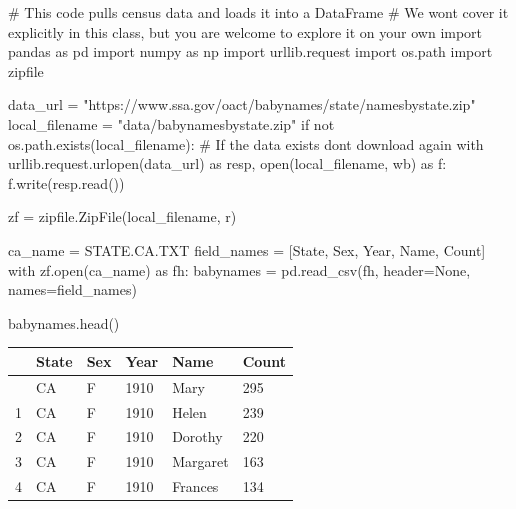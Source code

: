 \documentclass[
  letterpaper,
  DIV=11,
  numbers=noendperiod]{scrreprt}
\newenvironment{Shaded}{\begin{snugshade}}{\end{snugshade}}
\newcommand{\BuiltInTok}[1]{\textcolor[rgb]{0.00,0.23,0.31}{#1}}
\newcommand{\CommentTok}[1]{\textcolor[rgb]{0.37,0.37,0.37}{#1}}
\newcommand{\ControlFlowTok}[1]{\textcolor[rgb]{0.00,0.23,0.31}{#1}}
\newcommand{\ImportTok}[1]{\textcolor[rgb]{0.00,0.46,0.62}{#1}}
\newcommand{\KeywordTok}[1]{\textcolor[rgb]{0.00,0.23,0.31}{#1}}
\newcommand{\NormalTok}[1]{\textcolor[rgb]{0.00,0.23,0.31}{#1}}
\newcommand{\OperatorTok}[1]{\textcolor[rgb]{0.37,0.37,0.37}{#1}}
\newcommand{\StringTok}[1]{\textcolor[rgb]{0.13,0.47,0.30}{#1}}
\newcommand{\VariableTok}[1]{\textcolor[rgb]{0.07,0.07,0.07}{#1}}
\begin{document}
\begin{Shaded}
\begin{Highlighting}[]
\CommentTok{\# This code pulls census data and loads it into a DataFrame}
\CommentTok{\# We won\textquotesingle{}t cover it explicitly in this class, but you are welcome to explore it on your own}
\ImportTok{import}\NormalTok{ pandas }\ImportTok{as}\NormalTok{ pd}
\ImportTok{import}\NormalTok{ numpy }\ImportTok{as}\NormalTok{ np}
\ImportTok{import}\NormalTok{ urllib.request}
\ImportTok{import}\NormalTok{ os.path}
\ImportTok{import}\NormalTok{ zipfile}

\NormalTok{data\_url }\OperatorTok{=} \StringTok{"https://www.ssa.gov/oact/babynames/state/namesbystate.zip"}
\NormalTok{local\_filename }\OperatorTok{=} \StringTok{"data/babynamesbystate.zip"}
\ControlFlowTok{if} \KeywordTok{not}\NormalTok{ os.path.exists(local\_filename): }\CommentTok{\# If the data exists don\textquotesingle{}t download again}
    \ControlFlowTok{with}\NormalTok{ urllib.request.urlopen(data\_url) }\ImportTok{as}\NormalTok{ resp, }\BuiltInTok{open}\NormalTok{(local\_filename, }\StringTok{\textquotesingle{}wb\textquotesingle{}}\NormalTok{) }\ImportTok{as}\NormalTok{ f:}
\NormalTok{        f.write(resp.read())}

\NormalTok{zf }\OperatorTok{=}\NormalTok{ zipfile.ZipFile(local\_filename, }\StringTok{\textquotesingle{}r\textquotesingle{}}\NormalTok{)}

\NormalTok{ca\_name }\OperatorTok{=} \StringTok{\textquotesingle{}STATE.CA.TXT\textquotesingle{}}
\NormalTok{field\_names }\OperatorTok{=}\NormalTok{ [}\StringTok{\textquotesingle{}State\textquotesingle{}}\NormalTok{, }\StringTok{\textquotesingle{}Sex\textquotesingle{}}\NormalTok{, }\StringTok{\textquotesingle{}Year\textquotesingle{}}\NormalTok{, }\StringTok{\textquotesingle{}Name\textquotesingle{}}\NormalTok{, }\StringTok{\textquotesingle{}Count\textquotesingle{}}\NormalTok{]}
\ControlFlowTok{with}\NormalTok{ zf.}\BuiltInTok{open}\NormalTok{(ca\_name) }\ImportTok{as}\NormalTok{ fh:}
\NormalTok{    babynames }\OperatorTok{=}\NormalTok{ pd.read\_csv(fh, header}\OperatorTok{=}\VariableTok{None}\NormalTok{, names}\OperatorTok{=}\NormalTok{field\_names)}

\NormalTok{babynames.head()}
\end{Highlighting}
\end{Shaded}

\begin{longtable}[]{@{}llllll@{}}
\toprule\noalign{}
& State & Sex & Year & Name & Count \\
\midrule\noalign{}
\endhead
\bottomrule\noalign{}
\endlastfoot
0 & CA & F & 1910 & Mary & 295 \\
1 & CA & F & 1910 & Helen & 239 \\
2 & CA & F & 1910 & Dorothy & 220 \\
3 & CA & F & 1910 & Margaret & 163 \\
4 & CA & F & 1910 & Frances & 134 \\
\end{longtable}
\end{document}
